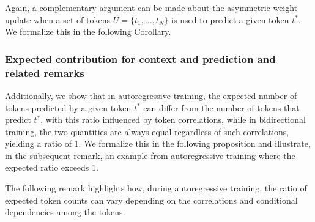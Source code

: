 

%

%
Again, a complementary argument can be made about the asymmetric weight update when a set of tokens $U = \{t_1, \dots, t_N\}$ is used to predict a given token $t^*$. We formalize this in the following Corollary.
%








%
\subsubsection{Expected contribution for context and prediction and related remarks}
\label{supp-math-prop-counting-prediction-context}
%
Additionally, we show that in autoregressive training, the expected number of tokens predicted by a given token \( t^* \) can differ from the number of tokens that predict \( t^* \), with this ratio influenced by token correlations, while in bidirectional training, the two quantities are always equal regardless of such correlations, yielding a ratio of 1.
%
We formalize this in the following proposition and illustrate, in the subsequent remark, an example from autoregressive training where the expected ratio exceeds 1.
%


%

The following remark highlights how, during autoregressive training, the ratio of expected token counts can vary depending on the correlations and conditional dependencies among the tokens.
%


